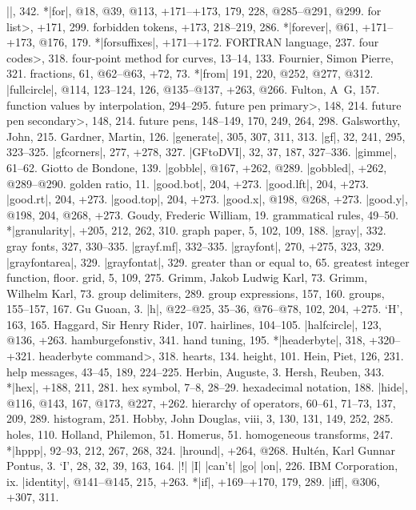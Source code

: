 |\fontname|, 342.
*|for|, @18, @39, @113, +171--+173, 179, 228, @285--@291, @299.
\<for list>, +171, 299.
forbidden tokens, +173, 218--219, 286.
*|forever|, @61, +171--+173, @176, 179.
*|forsuffixes|, +171--+172.
{\sevenrm FORTRAN} language, 237.
\<four codes>, 318.
four-point method for curves, 13--14, 133.
Fournier, Simon Pierre, 321. %
fractions, 61, @62--@63, +72, 73.
*|from| 191, 220, @252, @277, @312.
|fullcircle|, @114, 123--124, 126, @135--@137, +263, @266.
Fulton, A\period\ G\period, 157.
function values by interpolation, 294--295.
\<future pen primary>, 148, 214.
\<future pen secondary>, 148, 214.
future pens, 148--149, 170, 249, 264, 298.
\newletter
Galsworthy, John, 215.
Gardner, Martin, 126.
|generate|, 305, 307, 311, 313.
|gf|, 32, 241, 295, 323--325.
|gfcorners|, 277, +278, 327.
|GFtoDVI|, 32, 37, 187, 327--336.
|gimme|, 61--62.
Giotto de Bondone, 139.
|gobble|, @167, +262, @289.
|gobbled|, +262, @289--@290.
golden ratio, 11.
|good.bot|, 204, +273.
|good.lft|, 204, +273.
|good.rt|, 204, +273.
|good.top|, 204, +273.
|good.x|, @198, @268, +273.
|good.y|, @198, 204, @268, +273.
Goudy, Frederic William, 19.
grammatical rules, 49--50.
*|granularity|, +205, 212, 262, 310.
graph paper, 5, 102, 109, 188.
|gray|, 332.
gray fonts, 327, 330--335.
|grayf.mf|, 332--335.
|grayfont|, 270, +275, 323, 329.
|grayfontarea|, 329.
|grayfontat|, 329.
greater than or equal to, 65.
greatest integer function, \see floor.
grid, 5, 109, 275.
Grimm, Jakob Ludwig Karl, 73.
Grimm, Wilhelm Karl, 73.
group delimiters, 289.
group expressions, 157, 160.
groups, 155--157, 167.
Gu Guoan, 3.
\newletter
|h|, @22--@25, 35--36, @76--@78, 102, 204, +275.
`H', 163, 165.
Haggard, Sir Henry Rider, 107.
hairlines, 104--105.
|halfcircle|, 123, @136, +263.
hamburgefonstiv, 341.
hand tuning, 195.
*|headerbyte|, 318, +320--+321.
\<headerbyte command>, 318.
hearts, 134.
height, 101.
Hein, Piet, 126, 231.
help messages, 43--45, 189, 224--225.
Herbin, Auguste, 3.
Hersh, Reuben, 343.
*|hex|, +188, 211, 281.
hex symbol, 7--8, 28--29.
hexadecimal notation, 188.
|hide|, @116, @143, 167, @173, @227, +262.
hierarchy of operators, 60--61, 71--73, 137, 209, 289.
histogram, 251.
Hobby, John Douglas, viii, 3, 130, 131, 149, 252, 285.
holes, 110.
Holland, Philemon, 51.
Homerus, 51.
homogeneous transforms, 247.
*|hppp|, 92--93, 212, 267, 268, 324.
|hround|, +264, @268.
Hult\'en, Karl Gunnar Pontus, 3.
\newletter
`I', 28, 32, 39, 163, 164.
|!| |I| |can't| |go| |on|, 226.
IBM Corporation, ix.
|identity|, @141--@145, 215, +263.
*|if|, +169--+170, 179, 289.
|iff|, @306, +307, 311.
